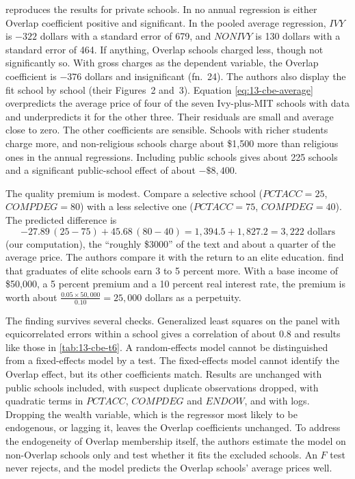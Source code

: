  reproduces the results for private schools. In no annual regression is either Overlap
coefficient positive and significant. In the pooled average regression, $\mathit{IVY}$ is $-322$ dollars with a
standard error of 679, and $\mathit{NONIVY}$ is 130 dollars with a standard error of 464. If anything, Overlap
schools charged less, though not significantly so. With gross charges as the dependent variable, the Overlap
coefficient is $-376$ dollars and insignificant (fn.~24). The authors also display the fit school by school
(their Figures~2 and~3). Equation \eqref{eq:13-cbe-average} overpredicts the average price of four of the seven
Ivy-plus-MIT schools with data and underpredicts it for the other three. Their residuals are small and average
close to zero. The other coefficients are sensible. Schools with richer
students charge more, and non-religious schools charge about \$1,500 more than religious ones in the annual
regressions.
Including public schools gives about 225 schools and a significant public-school effect of about $-\$8{,}400$.

The quality premium is modest. Compare a selective school ($\mathit{PCTACC} = 25$, $\mathit{COMPDEG} = 80$) with a
less selective one ($\mathit{PCTACC} = 75$, $\mathit{COMPDEG} = 40$). The predicted difference is
\begin{equation*}
  -27.89\,(25 - 75) + 45.68\,(80 - 40) = 1{,}394.5 + 1{,}827.2 = 3{,}222 \text{ dollars}
\end{equation*}
(our computation), the ``roughly \$3000'' of the text and about a quarter of the average price. The authors compare
it with the return to an elite education. \citet{JamesEtAl1989} find that graduates of elite schools earn 3 to 5
percent more. With a base income of \$50,000, a 5 percent premium and a 10 percent real interest rate, the premium
is worth about $\frac{0.05 \times 50{,}000}{0.10} = 25{,}000$ dollars as a perpetuity.

The finding survives several checks. Generalized least squares on the panel with equicorrelated errors within a
school gives a correlation of about 0.8 and results like those in \cref{tab:13-cbe-t6}. A random-effects model
cannot be distinguished from a fixed-effects model by a \citet{Hausman1978} test. The fixed-effects model cannot
identify the Overlap effect, but its other coefficients match. Results are unchanged with public schools
included, with suspect duplicate observations dropped, with quadratic terms in $\mathit{PCTACC}$,
$\mathit{COMPDEG}$ and $\mathit{ENDOW}$, and with logs. Dropping the wealth variable, which is the regressor most
likely to be endogenous, or lagging it, leaves the Overlap coefficients unchanged. To address the endogeneity of
Overlap membership itself, the authors estimate the model on non-Overlap schools only and test whether it fits the
excluded schools. An $F$ test never rejects, and the model predicts the Overlap schools' average prices well.

